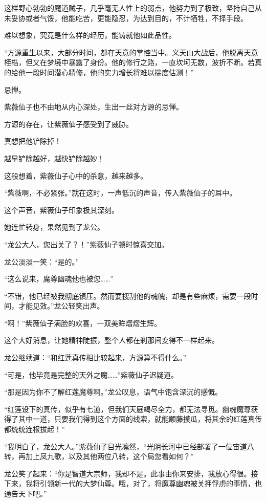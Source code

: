 \begin{this_body}
这样野心勃勃的魔道贼子，几乎毫无人性上的弱点，他努力到了极致，坚持自己从未妥协或者气馁，他能吃苦，更能隐忍，为达到目的，不计牺牲，不择手段。

难以想象，究竟是什么样的经历，能铸就他如此品性。

“方源重生以来，大部分时间，都在天意的掌控当中。义天山大战后，他脱离天意桎梏，但又在梦境中暴露了身份。他的修行之路，一直坎坷无数，波折不断。若真的给他一段时间潜心精修，他的实力增长将难以揣度估测！”

忌惮。

紫薇仙子也不由地从内心深处，生出一丝对方源的忌惮。

方源的存在，让紫薇仙子感受到了威胁。

真想把他铲除掉！

越早铲除越好，越快铲除越妙！

这般想着，紫薇仙子心中的杀意，越来越多。

“紫薇啊，不必紧张。”就在这时，一声低沉的声音，传入紫薇仙子的耳中。

这个声音，紫薇仙子印象极其深刻。

她连忙转身，果然见到了龙公。

“龙公大人，您出关了？！”紫薇仙子顿时惊喜交加。

龙公淡淡一笑：“是的。”

“这么说来，魔尊幽魂他也被您……”

“不错，他已经被我彻底镇压。然而要搜刮他的魂魄，却是有些麻烦，需要一段时间，才能见效。”龙公轻笑出声。

“啊！”紫薇仙子满脸的欢喜，一双美眸熠熠生辉。

这个大好消息，让她精神陡振，整个人都在刹那间变得不一样起来。

龙公继续道：“和红莲真传相比较起来，方源算不得什么。”

“可是，他毕竟是完整的天外之魔……”紫薇仙子迟疑道。

“那是因为你不了解红莲魔尊啊。”龙公叹息，语气中饱含深沉的感慨。

“红莲设下的真传，似乎有七道，但我们天庭竭尽全力，都无法寻觅。幽魂魔尊获得了其中一道，只要我们得到这个方面的线索，就能顺藤摸瓜，将其余的红莲真传都统统连根拔起！”

“我明白了，龙公大人。”紫薇仙子目光凛然，“光阴长河中已经部署了一位宙道八转，再加上凤九歌，以及其他两位八转，这个局您看如何？”

龙公笑了起来：“你是智道大宗师，我却不是。此事由你来安排，我放心得很。接下来，我将引领新一代的大梦仙尊。哦，对了，将魔尊幽魂被关押俘虏的事情，也通告天下吧。”


\end{this_body}
